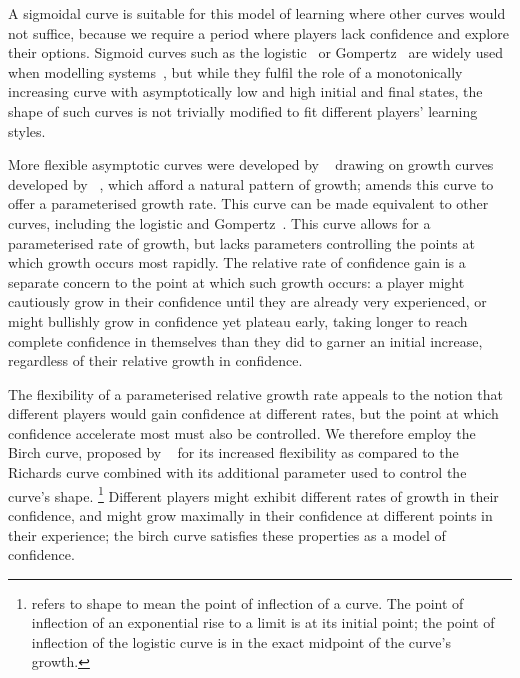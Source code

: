 A sigmoidal curve is suitable for this model of learning where other curves would not suffice, because we
require a period where players lack confidence and explore their options. Sigmoid curves such as
the logistic~\cite{verhulst1845loi} or Gompertz~\cite{gompertz1815curve} are widely used when modelling
systems~\cite{werker1997modelling}, but while they fulfil the role of a monotonically increasing curve
with asymptotically low and high initial and final states, the shape of such curves is not trivially modified
to fit different players' learning styles.

More flexible asymptotic curves were developed by
\citeauthor{richards1959flexiblegrowth}~\cite{richards1959flexiblegrowth} drawing on growth curves developed by
\citeauthor{von1938quantitative}~\cite{von1938quantitative}, which afford a natural pattern of growth;
\citeauthor{richards1959flexiblegrowth} amends this curve to offer a parameterised growth rate. This curve
can be made equivalent to other curves, including the logistic and Gompertz~\cite{france1984mathematical}.
This curve allows for a parameterised rate of growth, but lacks parameters controlling the points at which
growth occurs most rapidly. The relative rate of confidence gain is a separate concern to the point at which
such growth occurs: a player might cautiously grow in their confidence until they are already very experienced, or
might bullishly grow in confidence yet plateau early, taking longer to reach complete confidence in themselves
than they did to garner an initial increase, regardless of their relative growth in confidence.

The flexibility of a parameterised relative growth rate appeals to the notion that different players would
gain confidence at different rates, but the point at which confidence accelerate most must also be controlled.
We therefore employ the Birch curve, proposed by \citeauthor{birch1999new}~\cite{birch1999new} for
its increased flexibility as compared to the Richards curve combined with its additional parameter used to control
the curve's shape.
\footnote{\citeauthor{birch1999new} refers to shape to mean the point of inflection of a curve. The point
of inflection of an exponential rise to a limit is at its initial point; the point of inflection of the
logistic curve is in the exact midpoint of the curve's growth.}
Different players might exhibit different rates of growth in their confidence, and might grow maximally in their
confidence at different points in their experience; the birch curve satisfies these properties as a model of
confidence.


